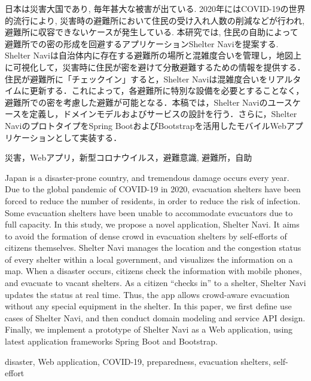 \documentclass[technicalreport,dvipdfmx]{ieicej}
\begin{document}
\begin{jabstract}
日本は災害大国であり, 毎年甚大な被害が出ている. 2020年にはCOVID-19の世界的流行により, 災害時の避難所において住民の受け入れ人数の削減などが行われ, 避難所に収容できないケースが発生している. 本研究では, 住民の自助によって避難所での密の形成を回避するアプリケーションShelter Naviを提案する. Shelter Naviは自治体内に存在する避難所の場所と混雑度合いを管理し，地図上に可視化して，災害時に住民が密を避けて分散避難するための情報を提供する．住民が避難所に「チェックイン」すると，Shelter Naviは混雑度合いをリアルタイムに更新する．これによって，各避難所に特別な設備を必要とすることなく，避難所での密を考慮した避難が可能となる．本稿では，Shelter Naviのユースケースを定義し，ドメインモデルおよびサービスの設計を行う．さらに，Shelter NaviのプロトタイプをSpring BootおよびBootstrapを活用したモバイルWebアプリケーションとして実装する．
\end{jabstract}
\begin{jkeyword}
災害，Webアプリ，新型コロナウイルス，避難意識, 避難所，自助
\end{jkeyword}
\begin{eabstract}
Japan is a disaster-prone country, and tremendous damage occurs every year. Due to the global pandemic of COVID-19 in 2020, evacuation shelters have been forced to reduce the number of residents, in order to reduce the risk of infection. Some evacuation shelters have been unable to accommodate evacuators due to full capacity. In this study, we propose a novel application, Shelter Navi. It aims to avoid the formation of dense crowd in evacuation shelters by self-efforts of citizens themselves. Shelter Navi manages the location and the congestion status of every shelter within a local government, and visualizes the information on a map. When a disaster occurs, citizens check the information with mobile phones, and evacuate to vacant shelters. As a citizen “checks in” to a shelter, Shelter Navi updates the status at real time. Thus, the app allows crowd-aware evacuation without any special equipment in the shelter. In this paper, we first define use cases of Shelter Navi, and then conduct domain modeling and service API design. Finally, we implement a prototype of Shelter Navi as a Web application, using latest application frameworks Spring Boot and Bootstrap.
\end{eabstract}
\begin{ekeyword}
disaster, Web application, COVID-19, preparedness, evacuation shelters, self-effort
\end{ekeyword}
\maketitle
\end{document}
